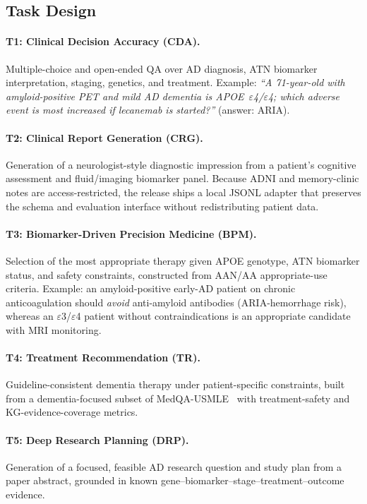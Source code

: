 \documentclass{article}
\begin{document}
\subsection{Task Design}
\label{sec:task-design}
\paragraph{T1: Clinical Decision Accuracy (CDA).} Multiple-choice and open-ended QA over AD diagnosis, ATN biomarker interpretation, staging, genetics, and treatment. Example: \emph{``A 71-year-old with amyloid-positive PET and mild AD dementia is APOE~$\varepsilon$4/$\varepsilon$4; which adverse event is most increased if lecanemab is started?''} (answer: ARIA).
\paragraph{T2: Clinical Report Generation (CRG).} Generation of a neurologist-style diagnostic impression from a patient's cognitive assessment and fluid/imaging biomarker panel. Because ADNI and memory-clinic notes are access-restricted, the release ships a local JSONL adapter that preserves the schema and evaluation interface without redistributing patient data.
\paragraph{T3: Biomarker-Driven Precision Medicine (BPM).} Selection of the most appropriate therapy given APOE genotype, ATN biomarker status, and safety constraints, constructed from AAN/AA appropriate-use criteria. Example: an amyloid-positive early-AD patient on chronic anticoagulation should \emph{avoid} anti-amyloid antibodies (ARIA-hemorrhage risk), whereas an $\varepsilon$3/$\varepsilon$4 patient without contraindications is an appropriate candidate with MRI monitoring.
\paragraph{T4: Treatment Recommendation (TR).} Guideline-consistent dementia therapy under patient-specific constraints, built from a dementia-focused subset of MedQA-USMLE~\citep{jin2021medqa} with treatment-safety and KG-evidence-coverage metrics.
\paragraph{T5: Deep Research Planning (DRP).} Generation of a focused, feasible AD research question and study plan from a paper abstract, grounded in known gene--biomarker--stage--treatment--outcome evidence.
\end{document}
